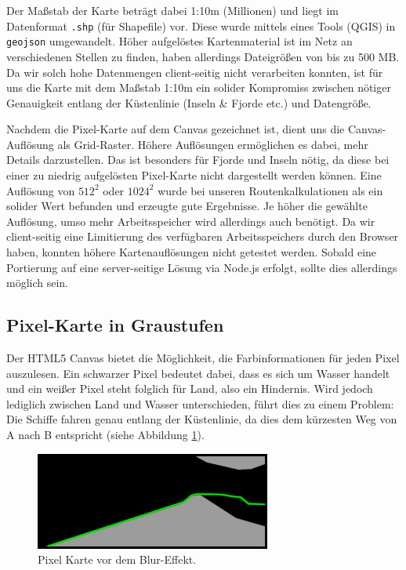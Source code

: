 \documentclass[letterpaper]{article}
\begin{document}
	Der Maßstab der Karte beträgt dabei 1:10m (Millionen) und liegt im Datenformat \texttt{.shp} (für Shapefile) vor. Diese wurde mittels eines Tools (QGIS) in \texttt{geojson} umgewandelt. Höher aufgelöstes Kartenmaterial ist im Netz an verschiedenen Stellen zu finden\footnotemark, haben allerdings Dateigrößen von bis zu 500 MB. Da wir solch hohe Datenmengen client-seitig nicht verarbeiten konnten, ist für uns die Karte mit dem Maßstab 1:10m ein solider Kompromiss zwischen nötiger Genauigkeit entlang der Küstenlinie (Inseln \& Fjorde etc.) und Datengröße.


	Nachdem die Pixel-Karte auf dem Canvas gezeichnet ist, dient uns die Canvas-Auflösung als Grid-Raster. Höhere Auflösungen ermöglichen es dabei, mehr Details darzustellen. Das ist besonders für Fjorde und Inseln nötig, da diese bei einer zu niedrig aufgelösten Pixel-Karte nicht dargestellt werden können. Eine Auflösung von $512^2$ oder $1024^2$ wurde bei unseren Routenkalkulationen als ein solider Wert befunden und erzeugte gute Ergebnisse. Je höher die gewählte Auflösung, umso mehr Arbeitsspeicher wird allerdings auch benötigt. Da wir client-seitig eine Limitierung des verfügbaren Arbeitsspeichers durch den Browser haben, konnten höhere Kartenauflösungen nicht getestet werden. Sobald eine Portierung auf eine server-seitige Lösung via Node.js erfolgt, sollte dies allerdings möglich sein.

	\subsection{Pixel-Karte in Graustufen}
		Der HTML5 Canvas bietet die Möglichkeit, die Farbinformationen für jeden Pixel auszulesen. Ein schwarzer Pixel bedeutet dabei, dass es sich um Wasser handelt und ein weißer Pixel steht folglich für Land, also ein Hindernis. Wird jedoch lediglich zwischen Land und Wasser unterschieden, führt dies zu einem Problem: Die Schiffe fahren genau entlang der Küstenlinie, da dies dem kürzesten Weg von A nach B entspricht (siehe Abbildung \ref{fig:route before blur}).

		\begin{figure}[!htbp]
			\centering
			\includegraphics[width=.7\linewidth]{route_before_blur}
			\caption[]{Pixel Karte vor dem Blur-Effekt.\footnotemark}
			\label{fig:route before blur}
		\end{figure}
\end{document}
